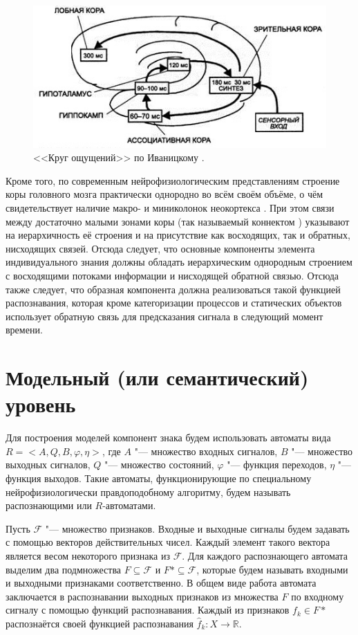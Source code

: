 \documentclass[a4paper, 12pt]{article}
\theoremstyle{plain}
\begin{document}
	\begin{figure}[h]
		\centering
		\includegraphics[width=0.7\linewidth]{ivanitsky_cyrcle}
		\caption{<<Круг ощущений>> по Иваницкому \cite{Aleksandrov2007}.}
		\label{fig:ivan_cyrcle}
	\end{figure}
	
	Кроме того, по современным нейрофизиологическим представлениям строение коры головного мозга практически однородно во всём своём объёме, о чём свидетельствует наличие макро- и миниколонок неокортекса \cite{Mountcastle1998,Rockland2010}. При этом связи между достаточно малыми зонами коры (так называемый коннектом \cite{Zador2012}) указывают на иерархичность её строения и на присутствие как восходящих, так и обратных, нисходящих связей. Отсюда следует, что основные компоненты элемента индивидуального знания должны обладать иерархическим однородным строением с восходящими потоками информации и нисходящей обратной связью. Отсюда также следует, что образная компонента должна реализоваться такой функцией распознавания, которая кроме категоризации процессов и статических объектов использует обратную связь для предсказания сигнала в следующий момент времени.
	
	\section{Модельный (или семантический) уровень}
	Для построения моделей компонент знака будем использовать автоматы вида  $R=<A,Q,B,\varphi, \eta>$, где $A$ "--- множество входных сигналов, $B$ "--- множество выходных сигналов, $Q$ "--- множество состояний, $\varphi$ "--- функция переходов, $\eta$ "--- функция выходов. Такие автоматы, функционирующие по специальному нейрофизиологически правдоподобному алгоритму, будем называть распознающими или $R$-автоматами. 
	
	Пусть $\mathcal F$ "--- множество признаков. Входные и выходные сигналы будем задавать с помощью  векторов действительных чисел. Каждый элемент такого вектора является весом некоторого признака из $\mathcal F$. Для каждого распознающего автомата выделим два подмножества $F\subseteq\mathcal F$ и $F*\subseteq\mathcal F$, которые будем называть входными и выходными признаками соответственно. В общем виде работа автомата заключается в распознавании выходных признаков из множества $F$ по входному сигналу с помощью функций распознавания. Каждый из признаков $f_k\in F*$ распознаётся своей функцией распознавания $\hat f_k: X\rightarrow \mathbb R$.
	
\end{document}
